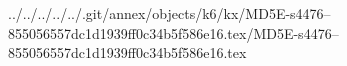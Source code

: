 ../../../../../.git/annex/objects/k6/kx/MD5E-s4476--855056557dc1d1939ff0c34b5f586e16.tex/MD5E-s4476--855056557dc1d1939ff0c34b5f586e16.tex
